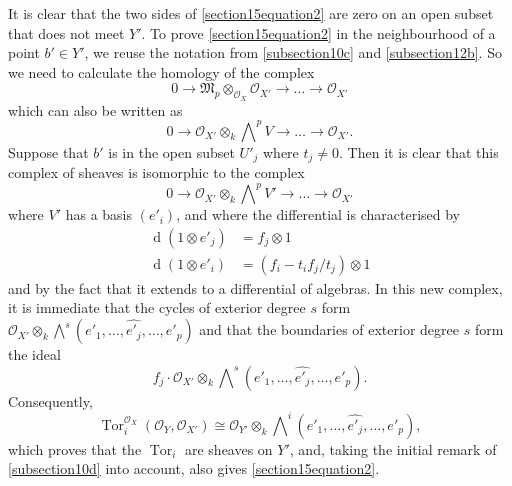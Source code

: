 \documentclass{article}
\theoremstyle{plain}
\theoremstyle{definition}
\newcommand{\sh}{\mathscr}
\newcommand{\dd}{\operatorname{d}\!}
\DeclareMathOperator{\Tor}{Tor}
\begin{document}
It is clear that the two sides of \cref{section15equation2} are zero on an open subset that does not meet $Y'$.
To prove \cref{section15equation2} in the neighbourhood of a point $b'\in Y'$, we reuse the notation from \cref{subsection10c} and \cref{subsection12b}.
So we need to calculate the homology of the complex
\[
  0 \to \mathfrak{M}_p\otimes_{\sh{O}_X}\sh{O}_{X'} \to \ldots \to \sh{O}_{X'}
\]
which can also be written as
\[
  0 \to \sh{O}_{X'}\otimes_k\bigwedge\nolimits^p V \to \ldots \to \sh{O}_{X'}.
\]
Suppose that $b'$ is in the open subset $U'_j$ where $t_j\neq0$.
Then it is clear that this complex of sheaves is isomorphic to the complex
\[
  0 \to \sh{O}_{X'}\otimes_k\bigwedge\nolimits^p V' \to \ldots \to \sh{O}_{X'}
\]
where $V'$ has a basis $(e'_i)$, and where the differential is characterised by
\begin{align*}
  \dd(1\otimes e'_j) &= f_j\otimes1
\\\dd(1\otimes e'_i) &= (f_i-t_if_j/t_j)\otimes1
\end{align*}
and by the fact that it extends to a differential of algebras.
In this new complex, it is immediate that the cycles of exterior degree $s$ form $\sh{O}_{X'}\otimes_k\bigwedge\nolimits^s(e'_1,\ldots,\widehat{e'_j},\ldots,e'_p)$ and that the boundaries of exterior degree $s$ form the ideal
\[
  f_j\cdot\sh{O}_{X'}\otimes_k\bigwedge\nolimits^s(e'_1,\ldots,\widehat{e'_j},\ldots,e'_p).
\]
Consequently,
\[
  \Tor_i^{\sh{O}_X}(\sh{O}_Y,\sh{O}_{X'})
  \cong
  \sh{O}_{Y'}\otimes_k\bigwedge\nolimits^i(e'_1,\ldots,\widehat{e'_j},\ldots,e'_p),
\]
which proves that the $\Tor_i$ are sheaves on $Y'$, and, taking the initial remark of \cref{subsection10d} into account, also gives \cref{section15equation2}.
\end{document}
